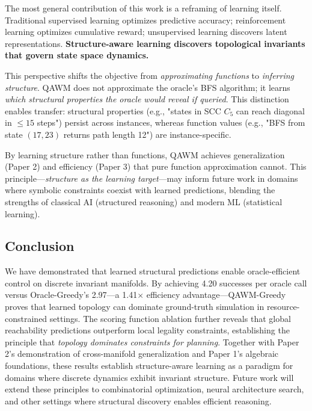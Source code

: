 The most general contribution of this work is a reframing of learning itself. Traditional supervised learning optimizes predictive accuracy; reinforcement learning optimizes cumulative reward; unsupervised learning discovers latent representations. \textbf{Structure-aware learning discovers topological invariants that govern state space dynamics.}

This perspective shifts the objective from \textit{approximating functions} to \textit{inferring structure}. QAWM does not approximate the oracle's BFS algorithm; it learns \textit{which structural properties the oracle would reveal if queried}. This distinction enables transfer: structural properties (e.g., "states in SCC $C_5$ can reach diagonal in $\le 15$ steps") persist across instances, whereas function values (e.g., "BFS from state $(17, 23)$ returns path length 12") are instance-specific.

By learning structure rather than functions, QAWM achieves generalization (Paper 2) and efficiency (Paper 3) that pure function approximation cannot. This principle—\textit{structure as the learning target}—may inform future work in domains where symbolic constraints coexist with learned predictions, blending the strengths of classical AI (structured reasoning) and modern ML (statistical learning).

\subsection{Conclusion}

We have demonstrated that learned structural predictions enable oracle-efficient control on discrete invariant manifolds. By achieving 4.20 successes per oracle call versus Oracle-Greedy's 2.97—a 1.41$\times$ efficiency advantage—QAWM-Greedy proves that learned topology can dominate ground-truth simulation in resource-constrained settings. The scoring function ablation further reveals that global reachability predictions outperform local legality constraints, establishing the principle that \textit{topology dominates constraints for planning}. Together with Paper 2's demonstration of cross-manifold generalization and Paper 1's algebraic foundations, these results establish structure-aware learning as a paradigm for domains where discrete dynamics exhibit invariant structure. Future work will extend these principles to combinatorial optimization, neural architecture search, and other settings where structural discovery enables efficient reasoning.
